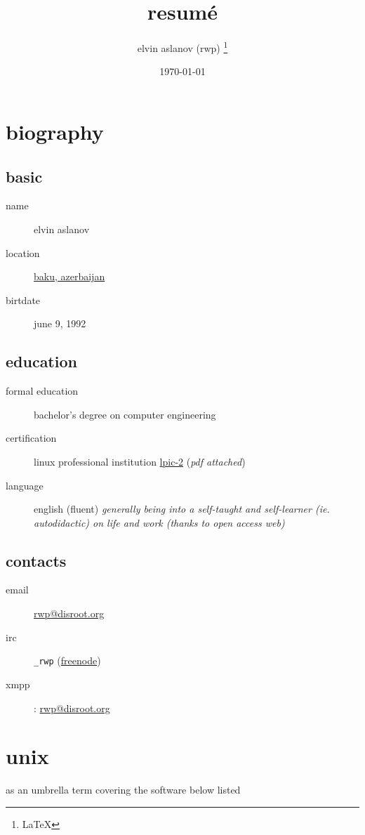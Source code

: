 \documentclass{article}
\title{resumé}
\author{elvin aslanov (rwp) \thanks{\LaTeX}}
\date{\today}
\begin{document}
\begin{titlepage}
\maketitle
\end{titlepage}
\section{biography}
\subsection{basic}
\begin{description}
\item[name] elvin aslanov
\item[location] \href{https://www.openstreetmap.org/relation/2415335}{baku, azerbaijan}
\item[birtdate] june 9, 1992
\end{description}
\subsection{education}
\begin{description}
\item[formal education] bachelor's degree on computer engineering
\item[certification] linux professional institution \href{https://cs.lpi.org/caf/Xamman/certification/verify/LPI000307519/bafrejwgeb}{lpic-2} (\textit{pdf attached})
\item[language] english (fluent)
\textit{generally being into a self-taught and self-learner (ie. autodidactic) on life and work (thanks to open access web)}
\end{description}
\subsection{contacts}
\begin{description}
\item[email] \href{mailto:rwp@disroot.org}{rwp@disroot.org}
\item[irc] \verb|_rwp| (\href{https://freenode.net/}{freenode})
\item[xmpp]: \url{rwp@disroot.org}
\end{description}
\section{unix}
as an umbrella term covering the software below listed
\end{document}
